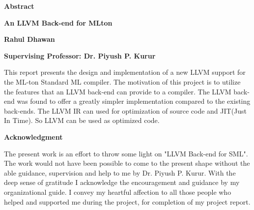 \documentclass[openany]{book}
\begin{document}
\thispagestyle{plain}
\begin{center}
    
    \huge{\textbf{Abstract}}
 
    \vspace{0.4cm}
    \large
    \textbf{An LLVM Back-end for MLton}
    
    \vspace{0.4cm}
    \textbf{Rahul Dhawan}
 
    \vspace{0.4cm}
    \textbf{Supervising Professor: Dr. Piyush P. Kurur }
    
    \vspace{1.0cm}
    \justify
    This report presents the design and implementation of a new LLVM support for the ML-ton Standard ML compiler. The motivation of this project is to utilize the features that an LLVM back-end can provide to a compiler.  The LLVM back-end was found to offer a greatly simpler implementation compared to the existing back-ends. The LLVM IR can used for optimization of source code and JIT(Just In Time). So LLVM can be used as optimized code. \newpage
\end{center}

\thispagestyle{plain}
\begin{center}
	
	\huge{\textbf{Acknowledgment}}
	\large
	\vspace{0.4cm}
	
	\vspace{1.0cm}
	The present work is an effort to throw some light on "LLVM Back-end for SML". The work would not have been possible to come to the present shape without the able guidance, supervision and help to me by Dr. Piyush P. Kurur. With the deep sense of gratitude I acknowledge the encouragement and guidance by my organizational guide. I convey my heartful affection to all those people who helped and supported me during the project, for completion of my project report.   
\end{center}

\hypersetup{
	colorlinks,
	citecolor=black,
	filecolor=black,
	linkcolor=black,
	urlcolor=black
}

\tableofcontents

\listoffigures

\listoftables
\end{document}
